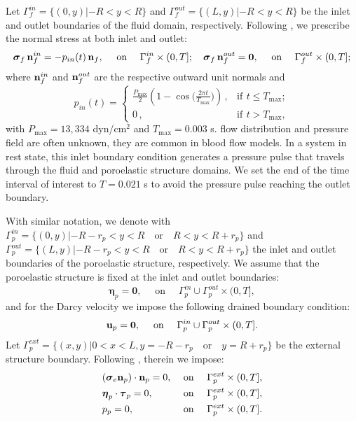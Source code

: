 \documentclass[11pt]{article}
\def\u{{\bf u}}
\def\n{{\bf n}}
\def\btau{\boldsymbol{\tau}}
\def\bbeta{\boldsymbol{\eta}}
\def\bs{\boldsymbol{\sigma}}
\def\cl {\nonumber \\}
\def\ds{\displaystyle}
\begin{document}
Let $\Gamma_f^{in}= \{(0,y) |-R < y < R \}$ and
$\Gamma_f^{out} = \{(L,y) |-R<y<R\}$ be the 
inlet and outlet boundaries of the fluid domain, respectively. 
Following \cite{wy2022,fpsi-augmented,pb2024},
we prescribe the normal stress at both inlet and outlet:
\begin{equation}\label{bdyeqn1}
 \bs_f \, \n_f^{in} = -p_{in}(t) \, \n_f, \quad \text{ on }\quad\Gamma_f^{in}\times(0,T]; \quad  \bs_f \, \n_f^{out} = \mathbf{0}, \quad \text{ on }\quad\Gamma_f^{out}\times(0,T];
 \end{equation}
where $\n_f^{in}$ and $\n_f^{out}$ are the respective outward unit normals and 
\begin{equation}\label{pressurefunc}
p_{in}(t) = \left\{ \begin{array}{ll}
\ds \frac{P_{\max}}{2}\left( 1-\cos \big(\frac{2\pi t}{T_{\max}} \big) \right) \,, & \text{if} \,\ t\leq T_{\max}; \\[2ex]
0 \,, & \text{if}\,\  t>T_{\max},
\end{array} \right.
\end{equation}
%
with $P_{\max}=13,334$ dyn/cm$^2$ and $T_{\max}=0.003$ s. 
flow distribution and pressure field are often unknown, they are common in blood flow models. 
In a system in rest state, this inlet boundary condition generates a pressure pulse that travels
through the fluid and poroelastic structure domains. 
We set the end of the time interval of interest to $T = 0.021$ s
to avoid the pressure pulse reaching the outlet boundary.
%

With similar notation, we denote with $\Gamma_p^{in} = \{(0,y)| -R -r_p<
y < R \quad\text{or}\quad R<y <R+r_p\}$ and $\Gamma_p^{out} = \{(L,y)| -R- r_p <y <R \quad\text{or}\quad R<y <R+r_p\}$ the inlet and outlet boundaries of the poroelastic structure, respectively. We assume that the poroelastic structure is fixed at the inlet and
outlet boundaries:
  \begin{equation}\label{bdyeqn2}
  \bbeta_p= \mathbf{0},  \quad \text{ on }\quad\Gamma_p^{in}\cup\Gamma_p^{out}\times(0,T],
  \end{equation}
and for the Darcy velocity we impose the following drained boundary condition:
\begin{equation}\label{bdyeqn5}
  \u_p= \mathbf{0},  \quad \text{ on }\quad\Gamma_p^{in}\cup\Gamma_p^{out}\times(0,T].
\end{equation}
Let $\Gamma_p^{ext} = \{(x,y)| 0<x<L,y=-R -r_p \quad\text{or}\quad y =R+r_p\}$ be the external structure boundary. Following \cite{wy2022}, therein we impose:
  \begin{align}
&(\bs_e \n_p)\cdot\n_p=0,   &&\text{ on }\quad\Gamma_p^{ext}\times(0,T], \cl
& \bbeta_p\cdot \btau_{p}=0,  && \text{ on }\quad\Gamma_p^{ext}\times(0,T], \cl
&p_p=0,  && \text{ on }\quad\Gamma_p^{ext}\times(0,T].
  \end{align}
\end{document}

